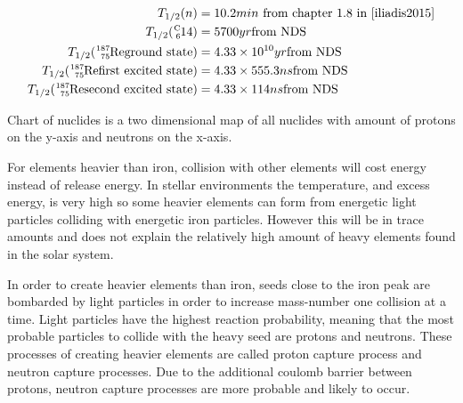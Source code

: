 \begin{align*}
  T_{1/2}(n) &= 10.2 min \textrm{\vspace{1cm} from chapter 1.8 in \cite{iliadis2015}} \\
  T_{1/2}(\isotope{14}{6}{C}) &= 5700 yr \textrm{\vspace{1cm}from NDS} \\
  T_{1/2}(\re{187} \textrm{ground state}) &= 4.33 \times 10^{10} yr \textrm{\vspace{1cm}from NDS} \\
  T_{1/2}(\re{187} \textrm{first excited state}) &= 4.33 \times 555.3 ns \textrm{\vspace{1cm}from NDS} \\
  T_{1/2}(\re{187} \textrm{second excited state}) &= 4.33 \times 114 ns \textrm{\vspace{1cm}from NDS} \\
\end{align*}

Chart of nuclides is a two dimensional map of all nuclides with amount of protons on the y-axis and neutrons on the x-axis.



For elements heavier than iron, collision with other elements will cost energy instead of release energy.
In stellar environments the temperature, and excess energy, is very high so some heavier elements can form from
energetic light particles colliding with energetic iron particles. However this will be in trace amounts
and does not explain the relatively high amount of heavy elements found in the solar system.

In order to create heavier elements than iron, seeds close to the iron peak 
are bombarded by light particles in order to increase mass-number one collision at a time.
Light particles have the highest reaction probability, meaning that the most probable particles to collide with the heavy seed
are protons and neutrons.
These processes of creating heavier elements are called proton capture process and neutron capture processes.
Due to the additional coulomb barrier between protons, neutron capture processes are more probable and likely to occur.


